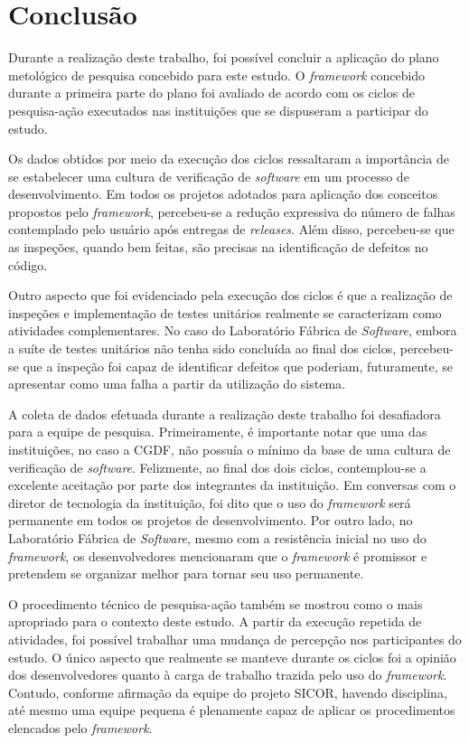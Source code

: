 \chapter{Conclusão}

Durante a realização deste trabalho, foi possível concluir a aplicação do plano metológico de pesquisa concebido para este estudo. O \textit{framework} concebido durante a primeira parte do plano foi avaliado de acordo com os ciclos de pesquisa-ação executados nas instituições que se dispuseram a participar do estudo.

Os dados obtidos por meio da execução dos ciclos ressaltaram a importância de se estabelecer uma cultura de verificação de \textit{software} em um processo de desenvolvimento. Em todos os projetos adotados para aplicação dos conceitos propostos pelo \textit{framework}, percebeu-se a redução expressiva do número de falhas contemplado pelo usuário após entregas de \textit{releases}. Além disso, percebeu-se que as inspeções, quando bem feitas, são precisas na identificação de defeitos no código.

Outro aspecto que foi evidenciado pela execução dos ciclos é que a realização de inspeções e implementação de testes unitários realmente se caracterizam como atividades complementares. No caso do Laboratório Fábrica de \textit{Software}, embora a suíte de testes unitários não tenha sido concluída ao final dos ciclos, percebeu-se que a inspeção foi capaz de identificar defeitos que poderiam, futuramente, se apresentar como uma falha a partir da utilização do sistema.

A coleta de dados efetuada durante a realização deste trabalho foi desafiadora para a equipe de pesquisa. Primeiramente, é importante notar que uma das instituições, no caso a CGDF, não possuía o mínimo da base de uma cultura de verificação de \textit{software}. Felizmente, ao final dos dois ciclos, contemplou-se a excelente aceitação por parte dos integrantes da instituição. Em conversas com o diretor de tecnologia da instituição, foi dito que o uso do \textit{framework} será permanente em todos os projetos de desenvolvimento. Por outro lado, no Laboratório Fábrica de \textit{Software}, mesmo com a resistência inicial no uso do \textit{framework}, os desenvolvedores mencionaram que o \textit{framework} é promissor e pretendem se organizar melhor para tornar seu uso permanente.

O procedimento técnico de pesquisa-ação também se mostrou como o mais apropriado para o contexto deste estudo. A partir da execução repetida de atividades, foi possível trabalhar uma mudança de percepção nos participantes do estudo. O único aspecto que realmente se manteve durante os ciclos foi a opinião dos desenvolvedores quanto à carga de trabalho trazida pelo uso do \textit{framework}. Contudo, conforme afirmação da equipe do projeto SICOR, havendo disciplina, até mesmo uma equipe pequena é plenamente capaz de aplicar os procedimentos elencados pelo \textit{framework}.

